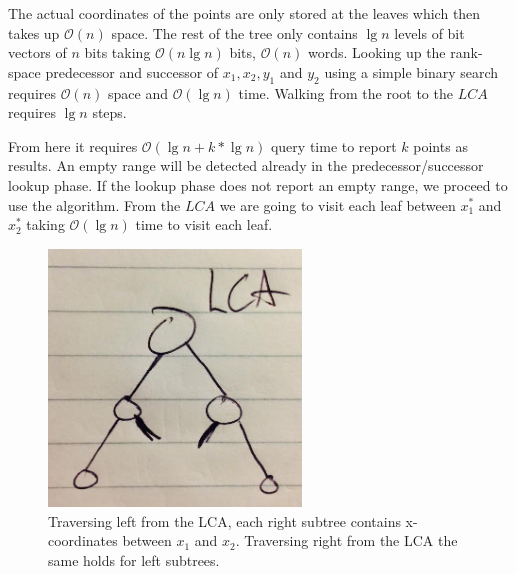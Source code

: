 The actual coordinates of the points are only stored at the leaves which then takes up $\mathcal{O}(n)$ space. The rest of the tree only contains $\lg n$ levels of bit vectors of $n$ bits taking $\mathcal{O}(n \lg n)$ bits, $\mathcal{O}(n)$ words. Looking up the rank-space predecessor and successor of $x_1, x_2, y_1$ and $y_2$ using a simple binary search requires $\mathcal{O}(n)$ space and $\mathcal{O}(\lg n)$ time. Walking from the root to the $LCA$ requires $\lg n$ steps.

From here it requires $\mathcal{O}(\lg n + k*\lg n)$ query time to report $k$ points as results. An empty range will be detected already in the predecessor/successor lookup phase. If the lookup phase does not report an empty range, we proceed to use the algorithm. From the $LCA$ we are going to visit each leaf between $x^*_1$ and $x^*_2$ taking $\mathcal{O}(\lg n)$ time to visit each leaf.   

\begin{figure}[p]
    \centering
    \includegraphics[width=0.6\textwidth]{pictures/LCA.png}
    \caption{Traversing left from the LCA, each right subtree contains x-coordinates between $x_1$ and $x_2$. Traversing right from the LCA the same holds for left subtrees.}
    \label{fig:LCA}
\end{figure}


